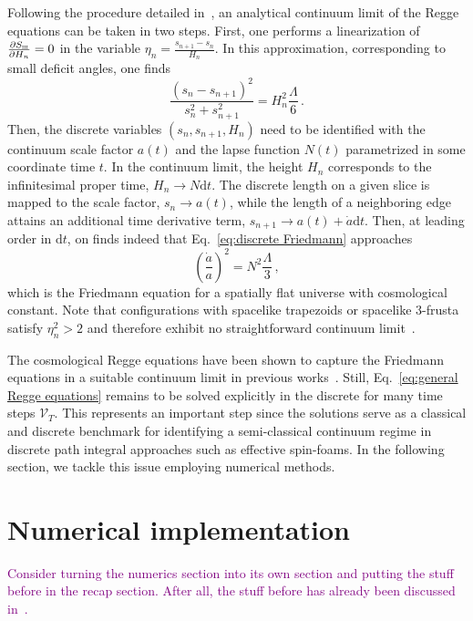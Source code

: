 \documentclass[amsmath,amssymb,aps,twocolumn,superscriptaddress,nofootinbib]{revtex4-1}
\newcommand{\caj}[1]{\textcolor{purple}{#1}}
\begin{document}
Following the procedure detailed in~\cite{Jercher:2023csk}, an analytical continuum limit of the Regge equations can be taken in two steps.
First, one performs a linearization of $\pdv{S_{\textsc{iii}}}{H_n} = 0$ in the variable $\eta_n = \frac{s_{n+1} - s_n}{H_n}$.
In this approximation, corresponding to small deficit angles, one finds
%
\begin{equation}\label{eq:discrete Friedmann}
\frac{(s_n - s_{n+1})^2}{s_n^2+s_{n+1}^2}  = H_n^2\frac{\Lambda}{6}\,.
\end{equation}
%
Then, the discrete variables $(s_n,s_{n+1},H_n)$ need to be identified with the continuum scale factor $a(t)$ and the lapse function $N(t)$ parametrized in some coordinate time $t$.
In the continuum limit, the height $H_n$ corresponds to the infinitesimal proper time, $H_n\rightarrow N\mathrm{d}t$.
The discrete length on a given slice is mapped to the scale factor, $s_n \rightarrow a(t)$, while the length of a neighboring edge attains an additional time derivative term, $s_{n+1}\rightarrow a(t) + \dot{a}\mathrm{d}t$.
Then, at leading order in $\mathrm{d}t$, on finds indeed that Eq.~\eqref{eq:discrete Friedmann} approaches
%
\begin{equation}
\left(\frac{\dot{a}}{a}\right)^2 = N^2\frac{\Lambda}{3}\,,
\end{equation}
%
which is the Friedmann equation for a spatially flat universe with cosmological constant.
Note that configurations with spacelike trapezoids or spacelike $3$-frusta satisfy $\eta_n^2>2$ and therefore exhibit no straightforward continuum limit~\cite{Jercher:2023csk}.

The cosmological Regge equations have been shown to capture  the Friedmann equations in a suitable continuum limit in previous works~\cite{Jercher:2023csk,Dittrich:2021gww,Bahr:2017bn,Brewin1999}.
Still, Eq.~\eqref{eq:general Regge equations} remains to be solved explicitly in the discrete for many time steps $\mathcal{V}_T$.
This represents an important step since the solutions serve as a classical and discrete benchmark for identifying a semi-classical continuum regime in discrete path integral approaches such as effective spin-foams.  
In the following section, we tackle this issue employing numerical methods.

\section{Numerical implementation}\label{sec:numerics}

\caj{Consider turning the numerics section into its own section and putting the stuff before in the recap section. After all, the stuff before has already been discussed in~\cite{Jercher:2023csk}.}
\end{document}
